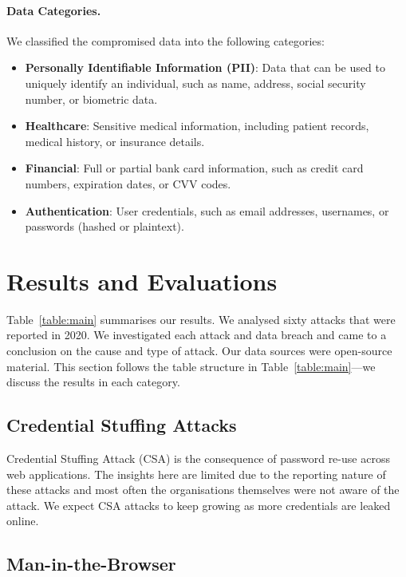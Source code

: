 \paragraph*{Data Categories.} We classified the compromised data into the following categories:
\begin{itemize}
\item \textbf{Personally Identifiable Information (PII)}: Data that can be used to uniquely identify an individual, such as name, address, social security number, or biometric data.
\item \textbf{Healthcare}: Sensitive medical information, including patient records, medical history, or insurance details.
\item \textbf{Financial}: Full or partial bank card information, such as credit card numbers, expiration dates, or CVV codes.
\item \textbf{Authentication}: User credentials, such as email addresses, usernames, or passwords (hashed or plaintext).
\end{itemize}


\section{Results and Evaluations}
\label{sec::chp3::results}

Table~\ref{table:main} summarises our results. We analysed sixty attacks that were reported in 2020. We investigated each attack and data breach and came to a conclusion on the cause and type of attack. Our data sources were open-source material. This section follows the table structure in Table~\ref{table:main}---we discuss the results in each category.



\subsection{Credential Stuffing Attacks}
\label{sec::chp3::csa}

Credential Stuffing Attack (CSA) is the consequence of password re-use across web applications. The insights here are limited due to the reporting nature of these attacks and most often the organisations themselves were not aware of the attack. We expect CSA attacks to keep growing as more credentials are leaked online.


\subsection{Man-in-the-Browser}
\label{sec::chp3::mitb}


